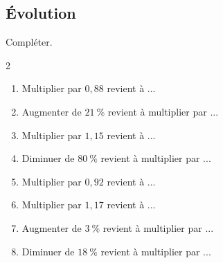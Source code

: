 {\begin{Exercice}
\end{Exercice}

\subsection*{Évolution}


\begin{Exercice} %
Compléter.
\vspace{-0.5cm}
\begin{multicols}{2}
\begin{enumerate}
	\item \begin{minipage}[t]{\linewidth}Multiplier par $0{,}88$ revient à ...\end{minipage}
	\item \begin{minipage}[t]{\linewidth}Augmenter de $21~\%$ revient à multiplier par ...\end{minipage}
	\item \begin{minipage}[t]{\linewidth}Multiplier par $1{,}15$ revient à ...\end{minipage}
	\item \begin{minipage}[t]{\linewidth}Diminuer de $80~\%$ revient à multiplier par ...\end{minipage}
	\item \begin{minipage}[t]{\linewidth}Multiplier par $0{,}92$ revient à ...\end{minipage}
	\item \begin{minipage}[t]{\linewidth}Multiplier par $1{,}17$ revient à ...\end{minipage}
	\item \begin{minipage}[t]{\linewidth}Augmenter de $3~\%$ revient à multiplier par ...\end{minipage}
	\item \begin{minipage}[t]{\linewidth}Diminuer de $18~\%$ revient à multiplier par ...\end{minipage}
\end{enumerate}
\end{multicols}
\end{Exercice}


\newpage




}
